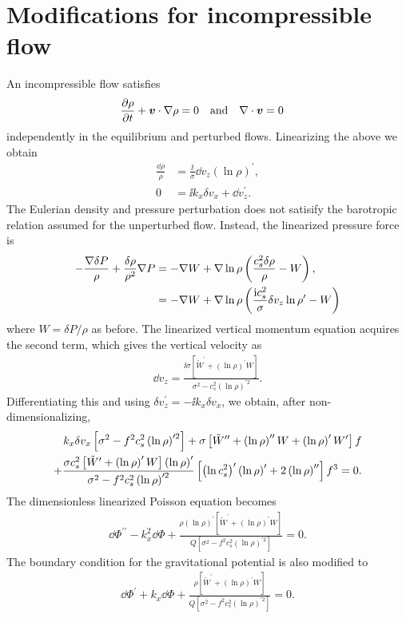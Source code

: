 \section{Modifications for incompressible flow} 
An incompressible flow satisfies 
\begin{align}
  \frac{\partial \rho}{\partial t} + \bm{v}\cdot\nabla\rho &= 0 \quad \mathrm{and} \quad
  \nabla\cdot\bm{v} = 0
\end{align}
independently in the equilibrium and perturbed flows. Linearizing the
above we obtain 
\begin{align}
  \frac{\dd\rho}{\rho} &= \frac{\ii }{\sigma}\dd v_z
  \left(\ln\rho\right)^\prime,\\
  0 &= \ii k_x \delta v_x + \dd v_z^\prime. 
\end{align}
The Eulerian density and pressure perturbation does not satisify the
barotropic relation assumed for the unperturbed flow. Instead, the
linearized pressure force is
\begin{align}
  -\frac{\nabla \delta P}{\rho} + \frac{\delta\rho}{\rho^2}\nabla P &=
  -\nabla W + \nabla\ln\rho\left(\frac{c_s^2\delta\rho}{\rho} - W\right),
  \notag\\
  & = -\nabla W + \nabla\ln\rho\left(\frac{\mathrm{i} c_s^2}{\sigma}\delta v _z \ln\rho^\prime  - W\right)
\end{align}
where $W=\delta P/\rho$ as before. The linearized vertical momentum
equation acquires the second term, which gives the vertical velocity as 
\begin{align}
\dd v_z =
\frac{\ii\sigma\left[\tilde{W}^\prime+\left(\ln\rho\right)^\prime W\right]}{\sigma^2 -
  c_s^2\left(\ln{\rho}\right)^{\prime 2}}. 
\end{align}
Differentiating this and using $\delta v_z^\prime = -\ii k_x \delta
v_x$, we obtain, after non-dimensionalizing, 
\begin{align}
  k_x \delta v_x\left[\sigma^2 -
  f^2 c_s^2\left(\ln{\rho}\right)^{\prime 2}\right] + 
  \sigma\left[\tilde{W}^{\prime\prime} +
    \left(\ln\rho\right)^{\prime\prime}W +
    \left(\ln\rho\right)^{\prime}W^\prime\right]f \notag\\ +
  \frac{\sigma c_s^2 \left[\tilde{W}^\prime+\left(\ln{\rho}\right)^\prime
    W\right]\left(\ln{\rho}\right)^\prime}{\sigma^2 -
  f^2c_s^2\left(\ln{\rho}\right)^{\prime 2}}\left[\left(\ln{c_s^2}\right)^\prime\left(\ln{\rho}\right)^\prime
      + 2\left(\ln{\rho}\right)^{\prime\prime}\right]f^3=0. 
\end{align}
The dimensionless linearized Poisson equation becomes
\begin{align}
  \dd\Phi^{\prime\prime} - k_x^2\dd\Phi +
  \frac{\rho\left(\ln{\rho}\right)^\prime\left[\tilde{W}^\prime+\left(\ln\rho\right)^\prime
      W\right]}{Q \left[\sigma^2 -
  f^2c_s^2\left(\ln{\rho}\right)^{\prime 2}\right]} = 0.  
\end{align}
The boundary condition for the gravitational potential is also
modified to 
\begin{align}
  \dd\Phi^\prime + k_x\dd\Phi +
  \frac{\rho\left[\tilde{W}^\prime+\left(\ln\rho\right)^\prime
      W\right]}{Q\left[\sigma^2 - f^2c_s^2\left(\ln{\rho}\right)^{\prime 2}\right]}=0.
\end{align}
